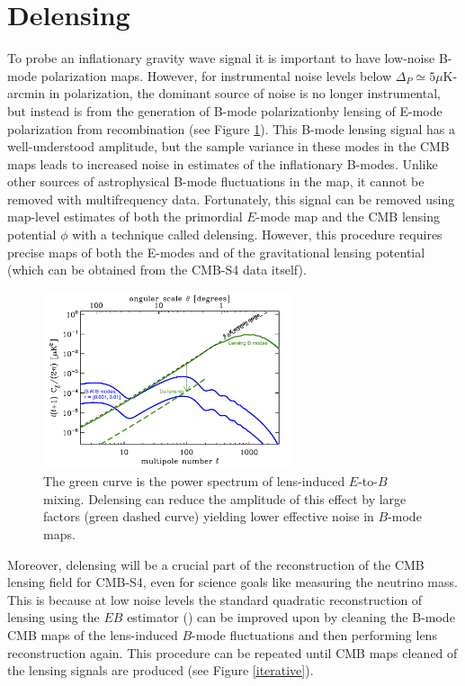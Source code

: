 \section{Delensing}\label{delens}

To probe an inflationary gravity wave signal it is important to have low-noise B-mode polarization maps. However, for instrumental noise levels below $\Delta_P \simeq 5 \mu$K-arcmin in polarization, the dominant source of noise is no longer instrumental, but instead is from the generation of B-mode polarizationby lensing of E-mode polarization from recombination (see Figure \ref{snowmssDelens}).  This B-mode lensing signal has a well-understood amplitude, but the sample variance in these modes in the CMB maps leads to increased noise in estimates of the inflationary B-modes. Unlike other sources of astrophysical B-mode fluctuations in the map, it cannot be removed with multifrequency data.  Fortunately, this signal can be removed using map-level estimates of both the primordial $E$-mode map and the CMB lensing potential $\phi$ with a technique called delensing. However, this procedure requires
precise maps of both the E-modes and of the gravitational lensing potential
(which can be obtained from the CMB-S4 data itself).

\begin{figure}[htbp]
\centering
\includegraphics[width=0.65\textwidth]{CMBLensing/cmb_powspec_for_s4scibooklensing.pdf}
\caption{The green curve is the power spectrum of lens-induced $E$-to-$B$ mixing.  Delensing can reduce the amplitude of this effect by large factors (green dashed curve) yielding lower effective noise in $B$-mode maps.}
\label{snowmssDelens}
\end{figure}

Moreover, delensing will be a crucial part of the reconstruction of the CMB lensing field for CMB-S4, even for science goals like measuring the neutrino mass.  This is because at low noise levels the standard quadratic reconstruction of lensing using the $EB$ estimator (\cite{Hu:2001kj}) can be improved upon by cleaning the B-mode CMB maps of the lens-induced $B$-mode fluctuations and then performing lens reconstruction again.  This procedure can be repeated until CMB maps cleaned of the lensing signals are produced (see Figure \ref{iterative}).  


